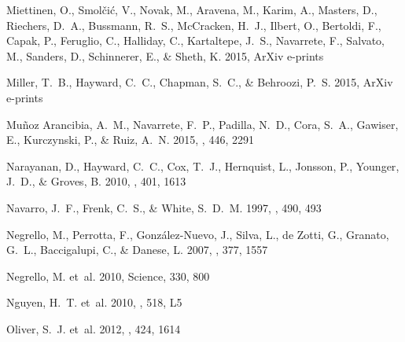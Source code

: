 \documentclass[iop]{emulateapj}
\begin{document}
\begin{thebibliography}{107}
{Miettinen}, O., {Smol{\v c}i{\'c}}, V., {Novak}, M., {Aravena}, M., {Karim},
  A., {Masters}, D., {Riechers}, D.~A., {Bussmann}, R.~S., {McCracken}, H.~J.,
  {Ilbert}, O., {Bertoldi}, F., {Capak}, P., {Feruglio}, C., {Halliday}, C.,
  {Kartaltepe}, J.~S., {Navarrete}, F., {Salvato}, M., {Sanders}, D.,
  {Schinnerer}, E., \& {Sheth}, K. 2015, ArXiv e-prints

{Miller}, T.~B., {Hayward}, C.~C., {Chapman}, S.~C., \& {Behroozi}, P.~S. 2015,
  ArXiv e-prints

{Mu{\~n}oz Arancibia}, A.~M., {Navarrete}, F.~P., {Padilla}, N.~D., {Cora},
  S.~A., {Gawiser}, E., {Kurczynski}, P., \& {Ruiz}, A.~N. 2015, \mnras, 446,
  2291

{Narayanan}, D., {Hayward}, C.~C., {Cox}, T.~J., {Hernquist}, L., {Jonsson},
  P., {Younger}, J.~D., \& {Groves}, B. 2010, \mnras, 401, 1613

{Navarro}, J.~F., {Frenk}, C.~S., \& {White}, S.~D.~M. 1997, \apj, 490, 493

{Negrello}, M., {Perrotta}, F., {Gonz{\'a}lez-Nuevo}, J., {Silva}, L., {de
  Zotti}, G., {Granato}, G.~L., {Baccigalupi}, C., \& {Danese}, L. 2007,
  \mnras, 377, 1557

{Negrello}, M. {et~al.} 2010, Science, 330, 800

{Nguyen}, H.~T. {et~al.} 2010, \aap, 518, L5

{Oliver}, S.~J. {et~al.} 2012, \mnras, 424, 1614


\end{thebibliography}
\end{document}
